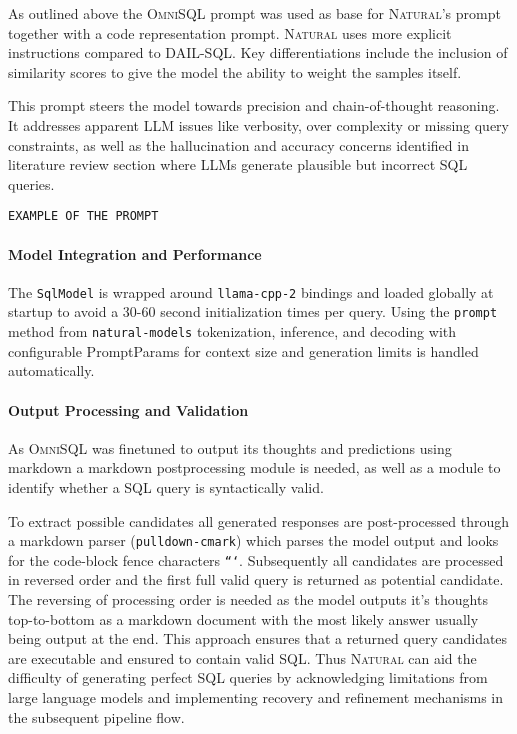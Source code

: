 As outlined above the \textsc{OmniSQL} prompt was used as base for
\textsc{Natural}'s prompt together with a code representation prompt.
\textsc{Natural} uses more explicit instructions compared to DAIL-SQL. Key
differentiations include the inclusion of similarity scores to give the model
the ability to weight the samples itself.

This prompt steers the model towards precision and chain-of-thought reasoning. 
It addresses apparent LLM issues like verbosity, over complexity or missing
query constraints, as well as the hallucination and accuracy concerns
identified in literature review section where LLMs generate plausible but
incorrect SQL queries.

\begin{verbatim}
EXAMPLE OF THE PROMPT
\end{verbatim}

\paragraph{Model Integration and Performance}

The \texttt{SqlModel} is wrapped around \texttt{llama-cpp-2} bindings and
loaded globally at startup to avoid a 30-60 second initialization times per
query. Using the \texttt{prompt} method from \texttt{natural-models}
tokenization, inference, and decoding with configurable PromptParams for
context size and generation limits is handled automatically.

\paragraph{Output Processing and Validation}

As \textsc{OmniSQL} was finetuned to output its thoughts and predictions using
markdown a markdown postprocessing module is needed, as well as a module to
identify whether a SQL query is syntactically valid.

To extract possible candidates all generated responses are post-processed
through a markdown parser (\texttt{pulldown-cmark}) which parses the model
output and looks for the code-block fence characters \texttt{```}.
Subsequently all candidates are processed in reversed order and the first full
valid query is returned as potential candidate. The reversing of processing
order is needed as the model outputs it's thoughts top-to-bottom as a markdown
document with the most likely answer usually being output at the end. This
approach ensures that a returned query candidates are executable and
ensured to contain valid SQL. Thus \textsc{Natural} can aid the
difficulty of generating perfect SQL queries by acknowledging
limitations from large language models and implementing recovery and refinement
mechanisms in the subsequent pipeline flow.

